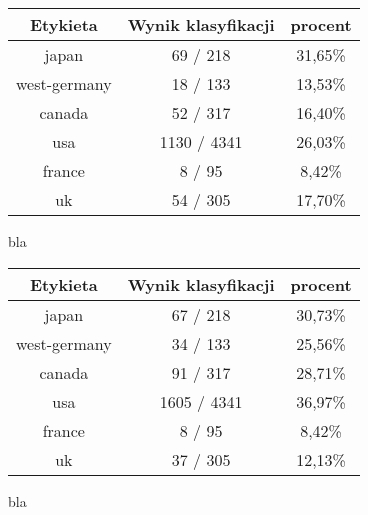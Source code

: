 \documentclass{classrep}
\begin{document}
\begin{tabular}{|c|c|c|}
\hline
Etykieta & Wynik klasyfikacji & procent\\
\hline
japan & 69 / 218 & 31,65\%\\
\hline
west-germany & 18 / 133 & 13,53\%\\
\hline
canada & 52 / 317 & 16,40\%\\
\hline
usa & 1130 / 4341 & 26,03\%\\
\hline
france & 8 / 95 & 8,42\%\\
\hline
uk & 54 / 305 & 17,70\%\\
\hline
\end{tabular}
{\raggedright bla \par}


\begin{tabular}{|c|c|c|}
\hline
Etykieta & Wynik klasyfikacji & procent\\
\hline
japan & 67 / 218 & 30,73\%\\
\hline
west-germany & 34 / 133 & 25,56\%\\
\hline
canada & 91 / 317 & 28,71\%\\
\hline
usa & 1605 / 4341 & 36,97\%\\
\hline
france & 8 / 95 & 8,42\%\\
\hline
uk & 37 / 305 & 12,13\%\\
\hline
\end{tabular}
{\raggedright 
bla 
\par}
\end{document}
